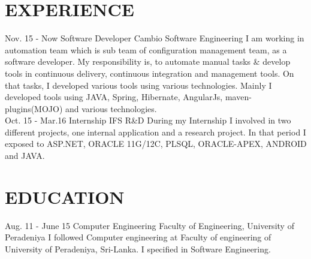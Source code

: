 \documentclass[]{cv-class}
\begin{document}
\section{EXPERIENCE}
\begin{entrylist}
  \entry
    {Nov. 15 - Now}
    {Software Developer}
    {Cambio Software Engineering}
    {I am working in automation team which is sub team of configuration management team, as a software developer. My responsibility is, to automate manual tasks \& develop tools in continuous delivery, continuous integration and management tools. On that tasks, I developed various tools using various technologies. Mainly I developed tools using JAVA, Spring, Hibernate, AngularJs, maven-plugins(MOJO) and various technologies.}
\\
  \entry
    {Oct. 15 - Mar.16}
    {Internship}
    {IFS R\&D}
    {During my Internship I involved in two different projects, one internal application and a research project. In that period I exposed to ASP.NET, ORACLE 11G/12C, PLSQL, ORACLE-APEX, ANDROID and JAVA.}
\end{entrylist}

\section{EDUCATION}
\begin{entrylist}
  \entry
    {Aug. 11 - June 15}
    {Computer Engineering}
    {Faculty of Engineering, University of Peradeniya}
    {I followed Computer engineering at Faculty of engineering of University of Peradeniya, Sri-Lanka. I specified in Software Engineering.}
\end{entrylist}
\end{document}
